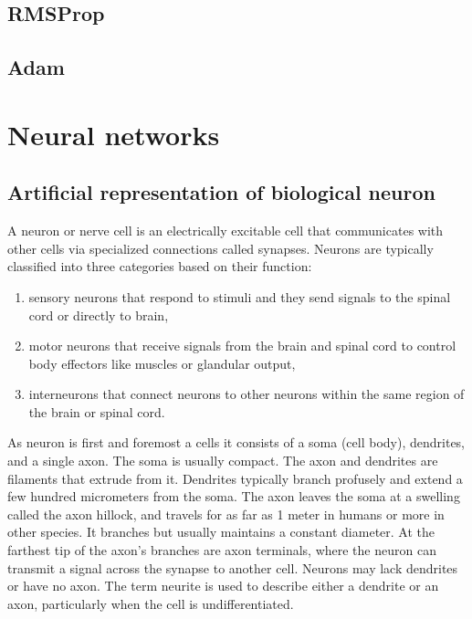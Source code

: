 \subsection{RMSProp}
\subsection{Adam}

\section{Neural networks}

\subsection{Artificial representation of biological neuron}
A neuron or nerve cell is an electrically excitable cell that communicates with other
cells via specialized connections called synapses. 
Neurons are typically classified into three categories based on their function:
\begin{enumerate}
	 \item sensory neurons that respond to stimuli and they send signals to the spinal cord or
		 directly to brain, 
	\item motor neurons that receive signals from the brain and spinal cord to control body
		effectors like muscles or glandular output,
	\item interneurons that connect neurons to other neurons within the same region of the brain 
		or spinal cord.
\end{enumerate}
As neuron is first and foremost a cells it consists of a soma (cell body), dendrites, and a 
single axon. The soma is usually compact. The axon and dendrites are filaments that extrude 
from it. Dendrites typically branch profusely and extend a few hundred micrometers from the soma.
The axon leaves the soma at a swelling called the axon hillock, and travels for as far as 1 meter 
in humans or more in other species. It branches but usually maintains a constant diameter.
At the farthest tip of the axon's branches are axon terminals, where the neuron can transmit
a signal across the synapse to another cell.
Neurons may lack dendrites or have no axon. The term neurite is used to describe either a dendrite
or an axon, particularly when the cell is undifferentiated.

